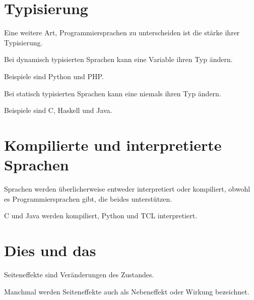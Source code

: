 \section{Typisierung}
Eine weitere Art, Programmiersprachen zu unterscheiden ist die stärke
ihrer Typisierung.

\begin{definition}
    Bei dynamisch typisierten Sprachen kann eine Variable ihren Typ ändern.
\end{definition}

Beispiele sind Python und PHP.

\begin{definition}
    Bei statisch typisierten Sprachen kann eine niemals ihren Typ ändern.
\end{definition}

Beispiele sind C, Haskell und Java.

\section{Kompilierte und interpretierte Sprachen}
Sprachen werden überlicherweise entweder interpretiert oder kompiliert,
obwohl es Programmiersprachen gibt, die beides unterstützen.

C und Java werden kompiliert, Python und TCL interpretiert.

\section{Dies und das}
\begin{definition}[Seiteneffekt]
    Seiteneffekte sind Veränderungen des Zustandes.
\end{definition}

Manchmal werden Seiteneffekte auch als Nebeneffekt oder Wirkung bezeichnet.

\begin{definition}[Unifikation]
\end{definition}
